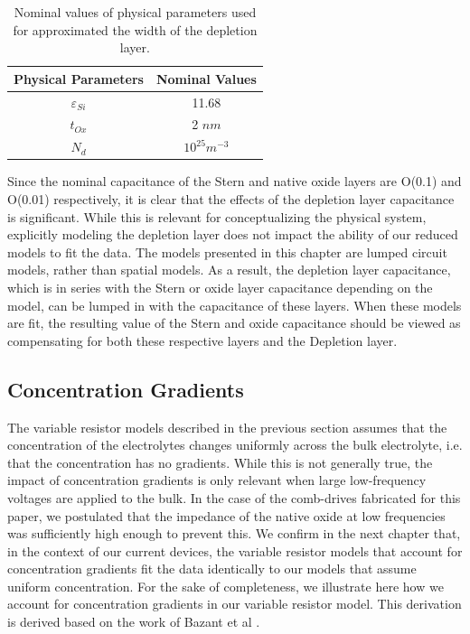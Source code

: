 \begin{table}[!htb]
\begin{center}
{\begin{tabular}{|c|c|}
	\hline
	\textbf{Physical Parameters} & \textbf{Nominal Values} \\
    \hline
    $\varepsilon_{Si}$ & 11.68 \\
    \hline 
    $t_{Ox}$ & 2 $nm$ \\
    \hline
    $N_d$  & $10^{25} m^{-3}$  \\
    \hline
\end{tabular}}
\caption{Nominal values of physical parameters used for approximated the width of the depletion layer.}\label{table_phys_param_nomvals}
\end{center}
\end{table} 

Since the nominal capacitance of the Stern and native oxide layers are O(0.1) and O(0.01) respectively, it is clear that the effects of the depletion layer capacitance is significant. While this is relevant for conceptualizing the physical system, explicitly modeling the depletion layer does not impact the ability of our reduced models to fit the data. The models presented in this chapter are lumped circuit models, rather than spatial models. As a result, the depletion layer capacitance, which is in series with the Stern or oxide layer capacitance depending on the model, can be lumped in with the capacitance of these layers. When these models are fit, the resulting value of the Stern and oxide capacitance  should be viewed as compensating for both these respective layers and the Depletion layer.

\subsection{Concentration Gradients}
The variable resistor models described in the previous section assumes that the concentration of the electrolytes changes uniformly across the bulk electrolyte, i.e. that the concentration has no gradients. While this is not generally true, the impact of concentration gradients is only relevant when large low-frequency voltages are applied to the bulk. In the case of the comb-drives fabricated for this paper, we postulated that the impedance of the native oxide at low frequencies was sufficiently high enough to prevent this. We confirm in the next chapter that, in the context of our current devices, the variable resistor models that account for concentration gradients fit the data identically to our models that assume uniform concentration. For the sake of completeness, we illustrate here how we account for concentration gradients in our variable resistor model. This derivation is derived based on the work of Bazant et al \cite{Bazant2004}.

